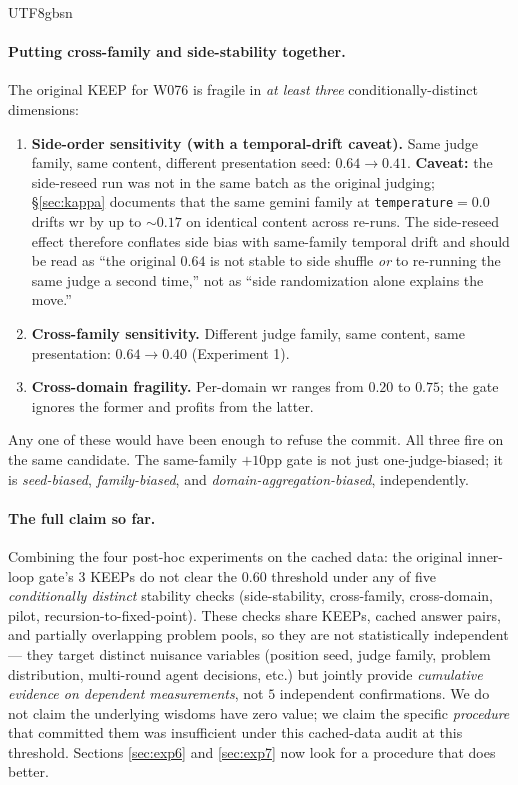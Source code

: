 \documentclass{article}
\begin{document}
\begin{CJK*}{UTF8}{gbsn}
\paragraph{Putting cross-family and side-stability together.} The
original KEEP for W076 is fragile in \emph{at least three}
conditionally-distinct dimensions:
\begin{enumerate}[leftmargin=*,topsep=2pt,itemsep=0pt]
  \item \textbf{Side-order sensitivity (with a temporal-drift
    caveat).} Same judge family, same content, different
    presentation seed: \(0.64 \to 0.41\). \textbf{Caveat:} the
    side-reseed run was not in the same batch as the original
    judging; \S\ref{sec:kappa} documents that the same gemini
    family at \texttt{temperature}\(=0.0\) drifts wr by up to
    \(\sim 0.17\) on identical content across re-runs. The
    side-reseed effect therefore conflates side bias with
    same-family temporal drift and should be read as ``the
    original \(0.64\) is not stable to side shuffle \emph{or} to
    re-running the same judge a second time,'' not as ``side
    randomization alone explains the move.''
  \item \textbf{Cross-family sensitivity.} Different judge family,
    same content, same presentation: \(0.64 \to 0.40\)
    (Experiment 1).
  \item \textbf{Cross-domain fragility.} Per-domain wr ranges from
    \(0.20\) to \(0.75\); the gate ignores the former and profits
    from the latter.
\end{enumerate}

\noindent Any one of these would have been enough to refuse the
commit. All three fire on the same candidate. The
same-family \(+10\)pp gate is not just one-judge-biased; it is
\emph{seed-biased}, \emph{family-biased}, and
\emph{domain-aggregation-biased}, independently.

\paragraph{The full claim so far.} Combining the four post-hoc
experiments on the cached data: the original inner-loop gate's
\(3\) KEEPs do not clear the \(0.60\) threshold under any of
five \emph{conditionally distinct} stability checks
(side-stability, cross-family, cross-domain, pilot,
recursion-to-fixed-point). These checks share KEEPs, cached
answer pairs, and partially overlapping problem pools, so they
are not statistically independent --- they target distinct
nuisance variables (position seed, judge family, problem
distribution, multi-round agent decisions, etc.) but jointly
provide \emph{cumulative evidence on dependent measurements},
not \(5\) independent confirmations. We do not claim the
underlying wisdoms have zero value; we claim the specific
\emph{procedure} that committed them was insufficient under this
cached-data audit at this threshold.
Sections \ref{sec:exp6} and \ref{sec:exp7} now look for a procedure
that does better.


\end{CJK*}
\end{document}
